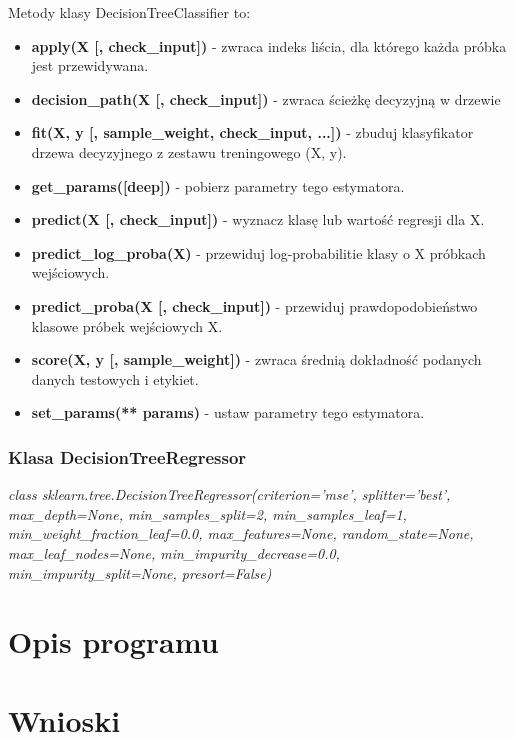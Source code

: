 \documentclass[10pt,a4paper]{article}
\begin{document}
Metody klasy DecisionTreeClassifier to:
\begin{itemize}
	\item \textbf{apply(X [, check\_input])} - zwraca indeks liścia, dla którego każda próbka jest przewidywana.
	\item \textbf{decision\_path(X [, check\_input])} - zwraca ścieżkę decyzyjną w drzewie
	\item \textbf{fit(X, y [, sample\_weight, check\_input, ...])} - zbuduj klasyfikator drzewa decyzyjnego z zestawu treningowego (X, y).
	\item \textbf{get\_params([deep])} - pobierz parametry tego estymatora.
	\item \textbf{predict(X [, check\_input])} - wyznacz klasę lub wartość regresji dla X.
	\item \textbf{predict\_log\_proba(X)} - przewiduj log-probabilitie klasy o X próbkach wejściowych.
	\item \textbf{predict\_proba(X [, check\_input])} - przewiduj prawdopodobieństwo klasowe próbek wejściowych X.
	\item \textbf{score(X, y [, sample\_weight])} - zwraca średnią dokładność podanych danych testowych i etykiet.
	\item \textbf{set\_params(** params)} - ustaw parametry tego estymatora.
\end{itemize}

\subsubsection{Klasa DecisionTreeRegressor}
\begin{flushleft}
	\textit{class sklearn.tree.DecisionTreeRegressor(criterion=’mse’, splitter=’best’, max\_depth=None, min\_samples\_split=2, min\_samples\_leaf=1, min\_weight\_fraction\_leaf=0.0, max\_features=None, random\_state=None, max\_leaf\_nodes=None, min\_impurity\_decrease=0.0, min\_impurity\_split=None, presort=False)}
\end{flushleft}\par
\vskip 0.2in


\section{Opis programu}

\section{Wnioski}
\end{document}
